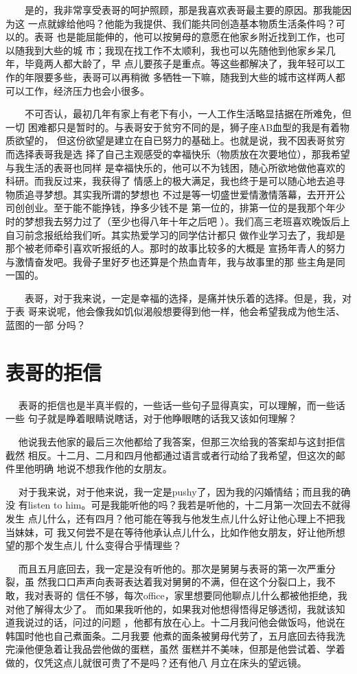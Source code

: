 \documentclass[12pt]{book}
\begin{document}
　　是的，我非常享受表哥的呵护照顾，那是我喜欢表哥最主要的原因。那我能因为这
一点就嫁给他吗？他能为我提供、我们能共同创造基本物质生活条件吗？可以的。表哥
也是能屈能伸的，他可以按舅母的意愿在他家乡附近找到工作，也可以随我到大些的城
市；我现在找工作不太顺利，我也可以先随他到他家乡呆几年，毕竟两人都大龄了，早
点儿要孩子是重点。等这些都解决了，我年轻可以工作的年限要多些，表哥可以再稍微
多牺牲一下嘛，随我到大些的城市这样两人都可以工作，经济压力也会小很多。

　　不可否认，最初几年有家上有老下有小，一人工作生活略显拮据在所难免，但一切
困难都只是暂时的。与表哥安于贫穷不同的是，狮子座AB血型的我是有着物质欲望的，
但这份欲望是建立在自已努力的基础上。也就是说，我不因表哥贫穷而选择表哥我是选
择了自己主观感受的幸福快乐（物质放在次要地位），那我希望与我生活的表哥也同样
是幸福快乐的，他可以不为钱困，随心所欲地做他喜欢的科研。而我反过来，我获得了
情感上的极大满足，我也终于是可以随心地去追寻物质追寻梦想。其实我所谓的梦想也
不过是等一切盛世爱情激情落幕，去开开公司创创业。至于能不能挣钱，挣多少钱不是
第一位的，排第一位的是我那个年少时的梦想我去努力过了（至少也得八年十年之后吧
）。我们高三老班喜欢晚饭后上自习前念报纸给我们听。其实热爱学习的同学估计都只
做作业学习去了，我却是那个被老师牵引喜欢听报纸的人。那时的故事比较多的大概是
宣扬年青人的努力与激情奋发吧。我骨子里好歹也还算是个热血青年，我与故事里的那
些主角是同一国的。

　　表哥，对于我来说，一定是幸福的选择，是痛并快乐着的选择。但是，我，对于表
哥来说呢，他会像我如饥似渴般想要得到他一样，他会希望我成为他生活、蓝图的一部
分吗？
\section{表哥的拒信}
\label{sec-8-36}

　 表哥的拒信也是半真半假的，一些话一些句子显得真实，可以理解，而一些话一些
句子就是睁着眼睛说瞎话，对于他睁眼瞎的话我又该如何理解？

　 他说我去他家的最后三次他都给了我答案，但那三次给我的答案却与这封拒信截然
相反。十二月、二月和四月他都通过语言或者行动给了我希望，但这次的邮件里他明确
地说不想我作他的女朋友。

　 对于我来说，对于他来说，我一定是pushy了，因为我的闪婚情结；而且我的确没
有listen to him。可是我能听他的吗？我若是听他的，十二月第一次回去不就得发生
点儿什么，还有四月？他可能在等我与他发生点儿什么好让他心理上不把我当妹妹，可
我又何尝不是在等待他承认点儿什么，比如作他女朋友，好让他所想望的那个发生点儿
什么变得合乎情理些？

　 而且五月底回去，我一定是没有听他的。那次是舅舅与表哥的第一次严重分裂，虽
然我口口声声向表哥表达着我对舅舅的不满，但在这个分裂口上，我不敢，我对表哥的
信任不够，每次office，家里想要同他聊点儿什么都被他拒绝，我对他了解得太少了。
而如果我听他的，如果我对他想得悟得足够透彻，我就该知道我说过的话，问过的问题
，他都有放在心上。十二月我问他会做饭吗，他说在韩国时他也自己煮面条。二月我要
他煮的面条被舅母代劳了，五月底回去待我洗完澡他便急着让我品尝他做的蛋糕，虽然
蛋糕并不美味，但那是他尝试着、学着做的，仅凭这点儿就很可贵了不是吗？还有他八
月立在床头的望远镜。
\end{document}
